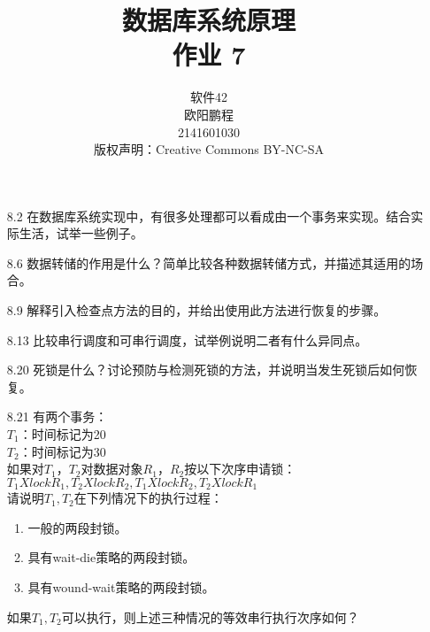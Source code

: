 \documentclass[]{ctexart}
\title{数据库系统原理 \\ 作业 7}
\author{软件42 \\ 欧阳鹏程 \\ 2141601030 \\ 版权声明：Creative Commons BY-NC-SA}
\begin{document}
\maketitle

\begin{enumerate}
	\item[8.2] 在数据库系统实现中，有很多处理都可以看成由一个事务来实现。结合实际生活，试举一些例子。 

	\newpage
	\item[8.6] 数据转储的作用是什么？简单比较各种数据转储方式，并描述其适用的场合。

	\vspace{10cm}
	\item[8.9] 解释引入检查点方法的目的，并给出使用此方法进行恢复的步骤。
	
	\newpage
	\item[8.13] 比较串行调度和可串行调度，试举例说明二者有什么异同点。
	
	\vspace{10cm}
	\item[8.20] 死锁是什么？讨论预防与检测死锁的方法，并说明当发生死锁后如何恢复。
	
	\newpage
	\item[8.21] 有两个事务：\\
	$T_{1}$：时间标记为20 \\
	$T_{2}$：时间标记为30 \\
	如果对$T_{1}$，$T_{2}$对数据对象$R_{1}$，$R_{2}$按以下次序申请锁：\\
	$T_{1} Xlock R_{1}, T_{2} Xlock R_{2}, T_{1} Xlock R_{2}, T_{2} Xlock R_{1}$ \\
	请说明$T_{1}, T_{2}$在下列情况下的执行过程：
	\begin{enumerate}
		\item 一般的两段封锁。
		\item 具有wait-die策略的两段封锁。
		\item 具有wound-wait策略的两段封锁。
	\end{enumerate}
	如果$T_{1}, T_{2}$可以执行，则上述三种情况的等效串行执行次序如何？
\end{enumerate}
\end{document}

